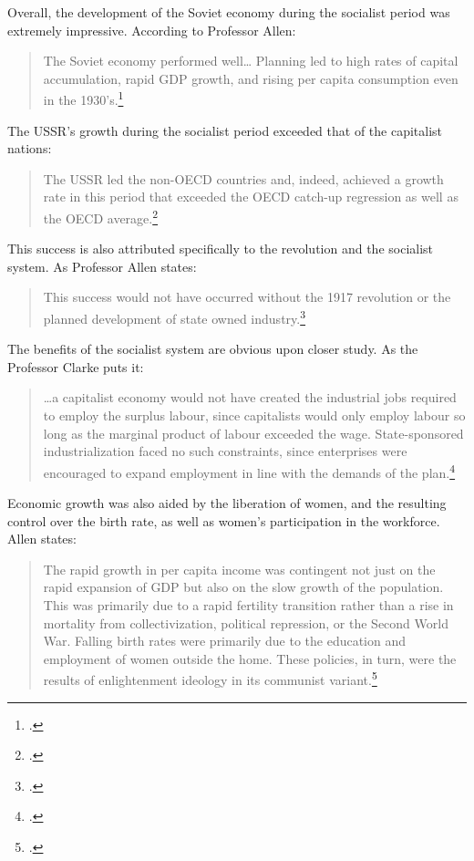 Overall, the development of the Soviet economy during the socialist
period was extremely impressive. According to Professor Allen:

\begin{quote}
The Soviet economy performed well\ldots{} Planning led to high rates of
capital accumulation, rapid GDP growth, and rising per capita
  consumption even in the 1930's.\footcite{allen2003farm}
\end{quote}

The USSR's growth during the socialist period exceeded that of the
capitalist nations:

\begin{quote}
The USSR led the non-OECD countries and, indeed, achieved a growth rate
in this period that exceeded the OECD catch-up regression as well as the
  OECD average.\footcite{allen2003farm}
\end{quote}

This success is also attributed specifically to the revolution and the
socialist system. As Professor Allen states:

\begin{quote}
This success would not have occurred without the 1917 revolution or the
  planned development of state owned industry.\footcite{allen2003farm}
\end{quote}

The benefits of the socialist system are obvious upon closer study. As
the Professor Clarke puts it:

\begin{quote}
\ldots a capitalist economy would not have created the industrial jobs
required to employ the surplus labour, since capitalists would only
employ labour so long as the marginal product of labour exceeded the
wage. State-sponsored industrialization faced no such constraints, since
enterprises were encouraged to expand employment in line with the
  demands of the plan.\footcite{allen2003farm}
\end{quote}

Economic growth was also aided by the liberation of women, and the
resulting control over the birth rate, as well as women's participation
in the workforce. Allen states:

\begin{quote}
The rapid growth in per capita income was contingent not just on the
rapid expansion of GDP but also on the slow growth of the population.
This was primarily due to a rapid fertility transition rather than a
rise in mortality from collectivization, political repression, or the
Second World War. Falling birth rates were primarily due to the
education and employment of women outside the home. These policies, in
turn, were the results of enlightenment ideology in its communist
  variant.\footcite{allen2003farm}
\end{quote}

